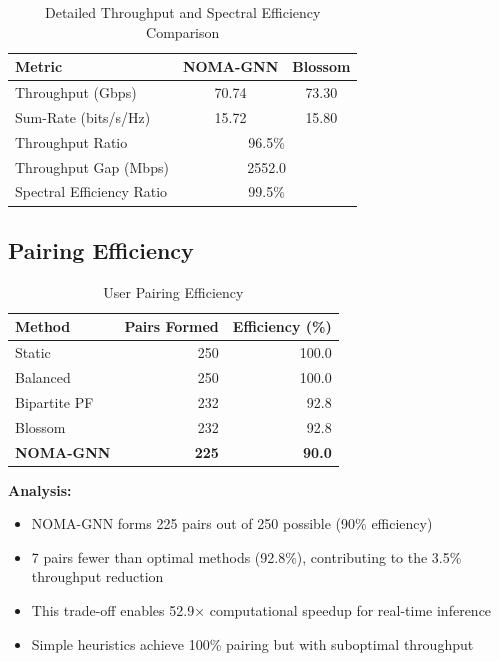 \begin{table}[H]
\centering
\begin{tabular}{lcc}
\toprule
\textbf{Metric} & \textbf{NOMA-GNN} & \textbf{Blossom} \\
\midrule
Throughput (Gbps) & 70.74 & 73.30 \\
Sum-Rate (bits/s/Hz) & 15.72 & 15.80 \\
\midrule
Throughput Ratio & \multicolumn{2}{c}{96.5\%} \\
Throughput Gap (Mbps) & \multicolumn{2}{c}{2552.0} \\
Spectral Efficiency Ratio & \multicolumn{2}{c}{99.5\%} \\
\bottomrule
\end{tabular}
\caption{Detailed Throughput and Spectral Efficiency Comparison}
\label{tab:throughput_detailed}
\end{table}

\subsection{Pairing Efficiency}

\begin{table}[H]
\centering
\begin{tabular}{lrr}
\toprule
\textbf{Method} & \textbf{Pairs Formed} & \textbf{Efficiency (\%)} \\
\midrule
Static & 250 & 100.0 \\
Balanced & 250 & 100.0 \\
Bipartite PF & 232 & 92.8 \\
Blossom & 232 & 92.8 \\
\textbf{NOMA-GNN} & \textbf{225} & \textbf{90.0} \\
\bottomrule
\end{tabular}
\caption{User Pairing Efficiency}
\label{tab:pairing_efficiency}
\end{table}

\textbf{Analysis:}
\begin{itemize}
    \item NOMA-GNN forms 225 pairs out of 250 possible (90\% efficiency)
    \item 7 pairs fewer than optimal methods (92.8\%), contributing to the 3.5\% throughput reduction
    \item This trade-off enables 52.9× computational speedup for real-time inference
    \item Simple heuristics achieve 100\% pairing but with suboptimal throughput
\end{itemize}

